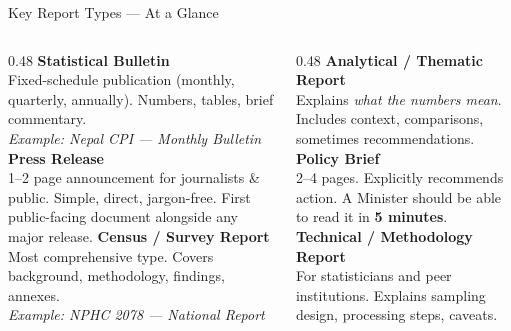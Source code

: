 \documentclass[xcolor={table,dvipsnames},aspectratio=169,11pt]{beamer}
\begin{document}
\begin{frame}{Key Report Types --- At a Glance}
    \begin{columns}[t]
        \begin{column}{0.48\textwidth}
            \small
            \textbf{Statistical Bulletin} \\
            Fixed-schedule publication (monthly, quarterly, annually). Numbers, tables, brief commentary. \\
            \textit{Example: Nepal CPI --- Monthly Bulletin}
            \vskip 0.2cm
            \textbf{Press Release} \\
            1--2 page announcement for journalists \& public. Simple, direct, jargon-free. First public-facing document alongside any major release.
            \vskip 0.2cm
            \textbf{Census / Survey Report} \\
            Most comprehensive type. Covers background, methodology, findings, annexes. \\
            \textit{Example: NPHC 2078 --- National Report}
        \end{column}
        \begin{column}{0.48\textwidth}
            \small
            \textbf{Analytical / Thematic Report} \\
            Explains \emph{what the numbers mean}. Includes context, comparisons, sometimes recommendations.
            \vskip 0.2cm
            \textbf{Policy Brief} \\
            2--4 pages. Explicitly recommends action. A Minister should be able to read it in \textbf{5 minutes}.
            \vskip 0.2cm
            \textbf{Technical / Methodology Report} \\
            For statisticians and peer institutions. Explains sampling design, processing steps, caveats.
        \end{column}
    \end{columns}
\end{frame}
\end{document}

